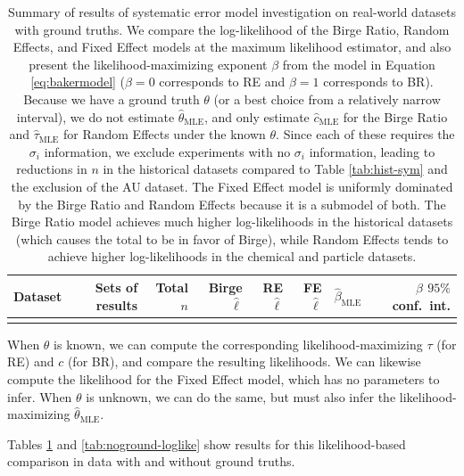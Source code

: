 \documentclass[letterpaper,12pt]{article}
\begin{document}
\begin{table}[htbp]
  \centering
  \caption{Summary of results of systematic error model investigation on real-world datasets with ground truths. We compare the log-likelihood of the Birge Ratio, Random Effects, and Fixed Effect models at the maximum likelihood estimator, and also present the likelihood-maximizing exponent $\beta$ from the model in Equation \ref{eq:bakermodel} ($\beta=0$ corresponds to RE and $\beta=1$ corresponds to BR). Because we have a ground truth $\theta$ (or a best choice from a relatively narrow interval), we do not estimate $\hat\theta_{\mathrm{MLE}}$, and only estimate $\hat{c}_{\mathrm{MLE}}$ for the Birge Ratio and $\hat{\tau}_{\mathrm{MLE}}$ for Random Effects under the known $\theta$. Since each of these requires the $\sigma_i$ information, we exclude experiments with no $\sigma_i$ information, leading to reductions in $n$ in the historical datasets compared to Table \ref{tab:hist-sym} and the exclusion of the AU dataset. The Fixed Effect model is uniformly dominated by the Birge Ratio and Random Effects because it is a submodel of both. The Birge Ratio model achieves much higher log-likelihoods in the historical datasets (which causes the total to be in favor of Birge), while Random Effects tends to achieve higher log-likelihoods in the chemical and particle datasets.}
  \label{tab:hist-syst}
  \smaller
  \begin{tabular}{lrrrrrrr}
    \hline Dataset & Sets of results & Total $n$ & Birge $\hat\ell$ & RE $\hat\ell$ & FE $\hat\ell$ & $\hat\beta_{\mathrm{MLE}}$ & $\beta$ $95\%$ conf.~int.  \\\hline\hline
    \\\hline
    \end{tabular}
  \end{table}

When $\theta$ is known, we can compute the corresponding likelihood-maximizing $\tau$ (for RE) and $c$ (for BR), and compare the resulting likelihoods. We can likewise compute the likelihood for the Fixed Effect model, which has no parameters to infer. When $\theta$ is unknown, we can do the same, but must also infer the likelihood-maximizing $\hat\theta_{\mathrm{MLE}}$.

Tables \ref{tab:hist-syst} and \ref{tab:noground-loglike} show results for this likelihood-based comparison in data with and without ground truths. 
\end{document}
